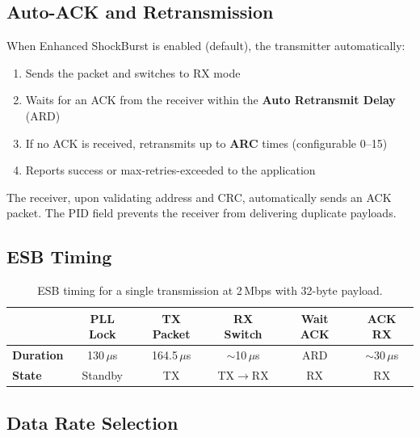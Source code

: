 \documentclass[11pt,a4paper]{article}
\begin{document}
\subsection{Auto-ACK and Retransmission}

When Enhanced ShockBurst is enabled (default), the transmitter automatically:

\begin{enumerate}
  \item Sends the packet and switches to RX mode
  \item Waits for an ACK from the receiver within the \textbf{Auto Retransmit Delay} (ARD)
  \item If no ACK is received, retransmits up to \textbf{ARC} times (configurable 0--15)
  \item Reports success or max-retries-exceeded to the application
\end{enumerate}

The receiver, upon validating address and CRC, automatically sends an ACK packet. The PID field prevents the receiver from delivering duplicate payloads.

\subsection{ESB Timing}

\begin{table}[htbp]
\centering
\caption{ESB timing for a single transmission at 2\,Mbps with 32-byte payload.}
\begin{tabular}{l c c c c c}
\toprule
 & PLL Lock & TX Packet & RX Switch & Wait ACK & ACK RX \\
\midrule
\textbf{Duration} & \cellcolor{nodeblue}130\,$\mu$s & \cellcolor{nodegreen}164.5\,$\mu$s & \cellcolor{nodeorange}${\sim}$10\,$\mu$s & \cellcolor{nodeyellow}ARD & \cellcolor{nodeblue}${\sim}$30\,$\mu$s \\
\textbf{State} & \cellcolor{nodeblue}Standby & \cellcolor{nodegreen}TX & \cellcolor{nodeorange}TX$\to$RX & \cellcolor{nodeyellow}RX & \cellcolor{nodeblue}RX \\
\bottomrule
\end{tabular}
\label{tab:esb-timing}
\end{table}

\subsection{Data Rate Selection}
\end{document}

